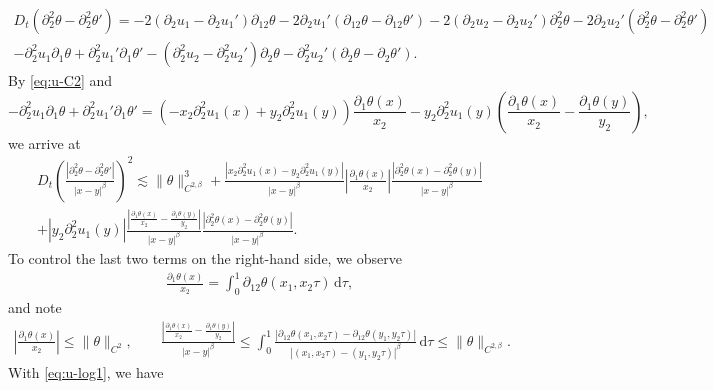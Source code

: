 \documentclass[10pt]{amsart}
\theoremstyle{definition}
\theoremstyle{remark}
\numberwithin{equation}{section}
\newcommand{\ud}{\mathrm{d}}
\newcommand{\rd}{\partial}
\newcommand{\0}{\emptyset}
\newcommand{\bt}{\beta}
\newcommand{\tht}{\theta}
\begin{document}
\begin{equation*}
\begin{gathered}
				D_t(\partial_2^2\tht - \partial_2^2\tht') = -2 (\partial_2u_1 - \partial_2u_1')\partial_{12}\tht -2 \partial_2u_1'(\partial_{12} \tht - \partial_{12} \tht') - 2(\rd_{2}u_{2} - \rd_{2}u_{2}')\rd_{2}^2\tht - 2\rd_{2}u_{2}' (\rd_{2}^2\tht - \rd_{2}^2\tht') \\
				- \rd_{2}^{2} u_1 \rd_1\tht + \rd_{2}^{2} u_1' \rd_1 \tht' - (\rd_{2}^{2}u_2 - \rd_{2}^{2}u_2') \rd_2\tht - \rd_{2}^{2}u_2' (\rd_2\tht -\rd_2\tht').
			\end{gathered}
		\end{equation*} By \eqref{eq:u-C2} and \begin{equation*}
			- \rd_{2}^{2} u_1 \rd_1\tht + \rd_{2}^{2} u_1' \rd_1 \tht' = (-x_2 \rd_2^2 u_1(x) + y_2 \rd_2^2 u_1(y)) \frac{\rd_1\tht(x)}{x_2} - y_2\rd_2^2 u_1(y) (\frac{\rd_1 \tht(x)}{x_2} - \frac{\rd_1 \tht(y)}{y_2}),
		\end{equation*} we arrive at \begin{equation*}
			\begin{gathered}
				D_t\left( \frac{|\partial_{2}^2\tht - \partial_{2}^2\tht'|}{|x-y|^{\bt}} \right)^2 \lesssim \| \tht \|_{C^{2,\beta}}^3 + \frac{|x_2 \rd_2^2 u_1(x) - y_2 \rd_2^2 u_1(y)|}{|x-y|^{\beta}} \left| \frac{\rd_1 \tht(x)}{x_2} \right| \frac{|\rd_{2}^{2} \tht(x) - \rd_2^2 \tht(y)|}{|x-y|^{\beta}} \\
				+ |y_2\rd_2^2 u_1(y)| \frac{|\frac{\rd_1 \tht(x)}{x_2} - \frac{\rd_1 \tht(y)}{y_2}|}{|x-y|^{\beta}} \frac{|\rd_{2}^{2} \tht(x) - \rd_2^2 \tht(y)|}{|x-y|^{\beta}}.
			\end{gathered}
		\end{equation*} To control the last two terms on the right-hand side, we observe \begin{equation*}
		\begin{aligned}
			\frac{\rd_1 \tht(x)}{x_2} = \int_0^1 \rd_{12} \tht(x_1,x_2 \tau) \,\ud \tau,
		\end{aligned}
	\end{equation*} and note \begin{equation*}
		\begin{aligned}
			\left| \frac{\rd_1 \tht(x)}{x_2} \right| \leq \| \tht \|_{C^2}, \qquad \frac{|\frac{\rd_1 \tht(x)}{x_2} - \frac{\rd_1 \tht(y)}{y_2}|}{|x-y|^{\beta}} \leq \int_0^1 \frac{|\rd_{12}\tht(x_1,x_2 \tau) - \rd_{12}\tht(y_1,y_2 \tau)|}{|(x_1,x_2\tau) - (y_1,y_2\tau)|^{\beta}} \,\ud \tau \leq \| \tht \|_{C^{2,\beta}}.
		\end{aligned}
	\end{equation*} With \eqref{eq:u-log1}, we have \begin{equation*}

\end{equation*}
\end{document}
